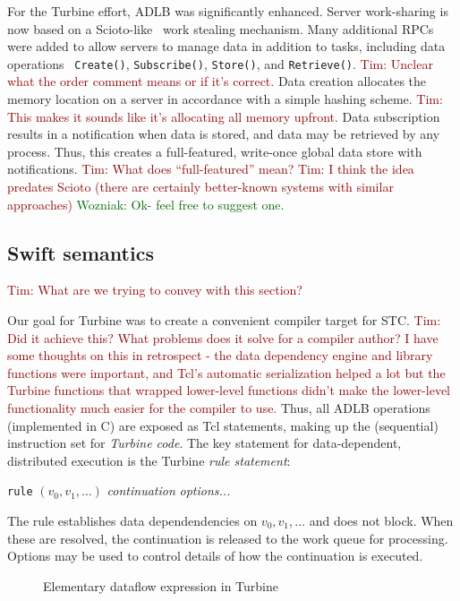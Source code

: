 \documentclass[conference,10pt]{IEEEtran}
\newcommand{\woz}[1]{ {\textcolor{darkgreen} { Wozniak: #1 }}}
\newcommand{\arm}[1]{ {\textcolor{darkred} { Tim: #1 }}}
\newcommand{\woz}[1]{}
\newcommand{\arm}[1]{}
\begin{document}
For the Turbine effort, ADLB was significantly enhanced.  Server
work-sharing is now based on a Scioto-like~\cite{scioto} work
stealing mechanism. Many additional RPCs were added to allow servers
to manage data in addition to tasks, including data operations {\tt
  Create()}, {\tt Subscribe()}, {\tt Store()}, and {\tt Retrieve()}.  
\arm{Unclear what the order comment means or if it's correct.}
Data creation allocates the memory
location on a server in accordance with a simple hashing scheme.  
\arm{This makes it sounds like it's allocating all memory upfront.}
Data
subscription results in a notification when data is stored, and data
may be retrieved by any process.  Thus, this creates a full-featured,
write-once global data store with notifications.
\arm{What does ``full-featured'' mean?}
\arm{I think the idea predates Scioto (there are
  certainly better-known systems with similar approaches)}
\woz{Ok- feel free to suggest one.}

\subsection{Swift semantics}
\arm{What are we trying to convey with this section?}

Our goal for Turbine was to create a convenient compiler target for
STC.  \arm{Did it achieve this? What problems does it solve for a
  compiler author?  I have some thoughts on this in retrospect - the
  data dependency engine and library functions were important, and
  Tcl's automatic serialization helped a lot but the Turbine functions
  that wrapped lower-level functions didn't make the lower-level
  functionality much easier for the compiler to use.}  Thus, all ADLB
operations (implemented in C) are exposed as Tcl statements, making up
the (sequential) instruction set for \emph{Turbine code}.  The key
statement for data-dependent, distributed execution is the Turbine
\emph{rule statement}:

{\tt rule} $(v_0,v_1,...)$ \textit{continuation} \textit{options...}

\noindent The rule establishes data dependendencies on $v_0,v_1,...$
and does not block. When these are resolved, the continuation is
released to the work queue for processing.  Options may be used to
control details of how the continuation is executed.

\begin{figure}[h]
  \begin{minipage}[b]{0.45\linewidth}
    
  \end{minipage} 
  \hspace{0.0cm}
  \begin{minipage}[b]{0.45\linewidth}
    
  \end{minipage}
  \caption{Elementary dataflow expression in Turbine
    \label{figure:rule-1}}
\end{figure}
\end{document}

